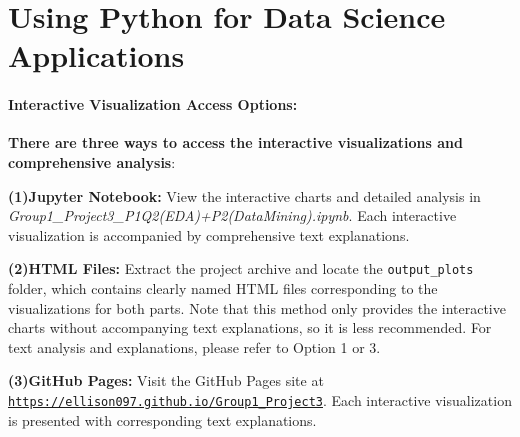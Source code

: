 \documentclass[12pt]{article}
\begin{document}
\section{Using Python for Data Science Applications}
\paragraph{\textbf{Interactive Visualization Access Options:}}
\textbf{There are three ways to access the interactive visualizations and comprehensive analysis}:

    \item \textbf{(1)Jupyter Notebook:} View the interactive charts and detailed analysis in \textit{Group1\_Project3\_P1Q2(EDA)+P2(DataMining).ipynb}. Each interactive visualization is accompanied by comprehensive text explanations.
    
    \item \textbf{(2)HTML Files:} Extract the project archive and locate the \texttt{output\_plots} folder, which contains clearly named HTML files corresponding to the visualizations for both parts. Note that this method only provides the interactive charts without accompanying text explanations, so it is less recommended. For text analysis and explanations, please refer to Option 1 or 3.
    
    \item \textbf{(3)GitHub Pages:} Visit the GitHub Pages site at \href{https://ellison097.github.io/Group1_Project3}{\texttt{https://ellison097.github.io/Group1\_Project3}}. Each interactive visualization is presented with corresponding text explanations.
\end{document}
